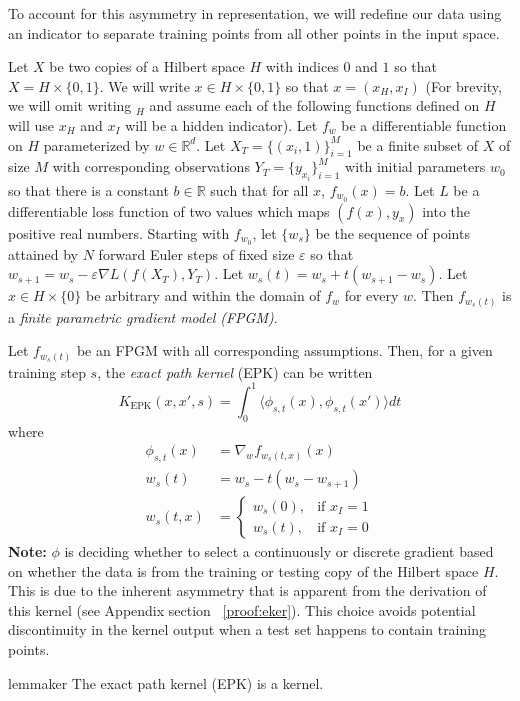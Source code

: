 To account for this asymmetry in representation, we will redefine our data using an indicator to separate training points from all other points in the input space.
\begin{definition}
\label{fpm}
Let $X$ be two copies of a Hilbert space $H$ with indices $0$ and $1$ so that $X = H \times \{0,1\}$. We will write $x \in H \times \{0,1\}$ so that $x = (x_H, x_I)$ (For brevity, we will omit writing $_H$ and assume each of the following functions defined on $H$ will use $x_H$ and $x_I$ will be a hidden indicator).
Let $ f_{w}$ be a differentiable function on $H$ parameterized by $w \in \mathbb{R}^d$. Let $X_T = \{(x_i, 1)\}_{i=1}^M$ be a finite subset of $X$ of size $M$ with corresponding observations $Y_T = \{y_{x_i}\}_{i=1}^M$ with initial parameters $w_0$ so that there is a constant $b \in \mathbb{R}$ such that for all $x$, $ f_{w_0}(x) = b$. Let $L$ be a differentiable loss function of two values which maps $(f(x), y_x)$ into the positive real numbers. Starting with $f_{w_0}$, let $\{w_s\}$ be the sequence of points attained by $N$ forward Euler steps of fixed size $\varepsilon$ so that $w_{s+1} = w_{s} - \varepsilon \nabla L(f(X_T), Y_T)$. Let $w_s(t) = w_s + t(w_{s+1}-w_s)$. Let $x \in H \times \{0\}$ be arbitrary and within the domain of $f_w$ for every $w$. Then $f_{w_s(t)}$ is a \emph{finite parametric gradient model (FPGM)}. 
\end{definition}

\begin{definition}
\label{epk}

Let $f_{w_s(t)}$ be an FPGM with all corresponding assumptions. Then, for a given training step $s$, the \emph{exact path kernel} (EPK) can be written  
\begin{equation}
 K_{\text{EPK}}(x, x', s) = \int_0^1\langle \phi_{s,t}(x), \phi_{s,t}(x')\rangle dt
 \label{eq2}
\end{equation}
where
\begin{align}
\phi_{s, t}(x) &=  \nabla_w f_{w_s(t,x)} (x)\\
w_s(t) &= w_s - t(w_s - w_{s+1})\\
w_s(t,x) &= \begin{cases} w_s(0), & \text{if } x_I = 1\\ w_s(t), & \text{if } x_I = 0 \end{cases}
\end{align}
\textbf{Note:} $\phi$ is deciding whether to select a continuously or
discrete gradient based on whether the data is from the training or
testing copy of the Hilbert space $H$. This is due to the inherent
asymmetry that is apparent from the derivation of this kernel (see
Appendix section ~\ref{proof:eker}). This choice avoids potential discontinuity in the kernel output when a test set happens to contain training points. 
\end{definition}
\begin{restatable}{lemma}{ker}
The exact path kernel (EPK) is a kernel.
\end{restatable}

